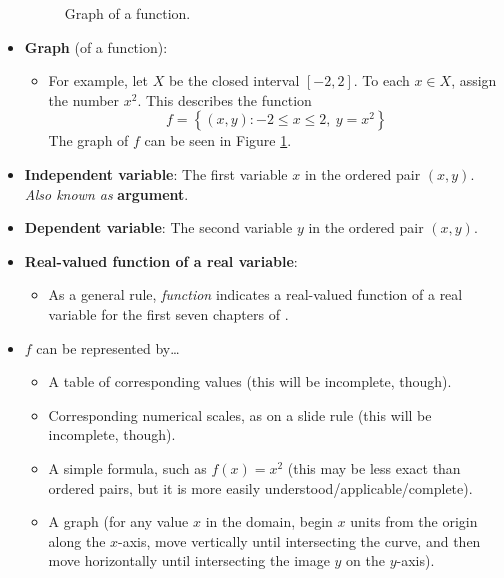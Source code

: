 \documentclass[../main.tex]{subfiles}
\begin{document}
\begin{itemize}
\begin{figure}[h!]
        \caption{Graph of a function.}
        \label{fig:graphOfFunction}
    \end{figure}
    \item \textbf{Graph} (of a function): 
    \begin{itemize}
        \item For example, let $X$ be the closed interval $[-2,2]$. To each $x\in X$, assign the number $x^2$. This describes the function
        \begin{equation*}
            f = \left\{ (x,y):-2\leq x\leq 2,\ y=x^2 \right\}
        \end{equation*}
        The graph of $f$ can be seen in Figure \ref{fig:graphOfFunction}.
    \end{itemize}
    \item \textbf{Independent variable}: The first variable $x$ in the ordered pair $(x,y)$. \emph{Also known as} \textbf{argument}.
    \item \textbf{Dependent variable}: The second variable $y$ in the ordered pair $(x,y)$.
    \item \textbf{Real-valued function of a real variable}: 
    \begin{itemize}
        \item As a general rule, \emph{function} indicates a real-valued function of a real variable for the first seven chapters of \textcite{bib:Thomas}.
    \end{itemize}
    \item $f$ can be represented by\dots
    \begin{itemize}
        \item A table of corresponding values (this will be incomplete, though).
        \item Corresponding numerical scales, as on a slide rule (this will be incomplete, though).
        \item A simple formula, such as $f(x)=x^2$ (this may be less exact than ordered pairs, but it is more easily understood/applicable/complete).
        \item A graph (for any value $x$ in the domain, begin $x$ units from the origin along the $x$-axis, move vertically until intersecting the curve, and then move horizontally until intersecting the image $y$ on the $y$-axis).

\end{itemize}
\end{itemize}
\end{document}
